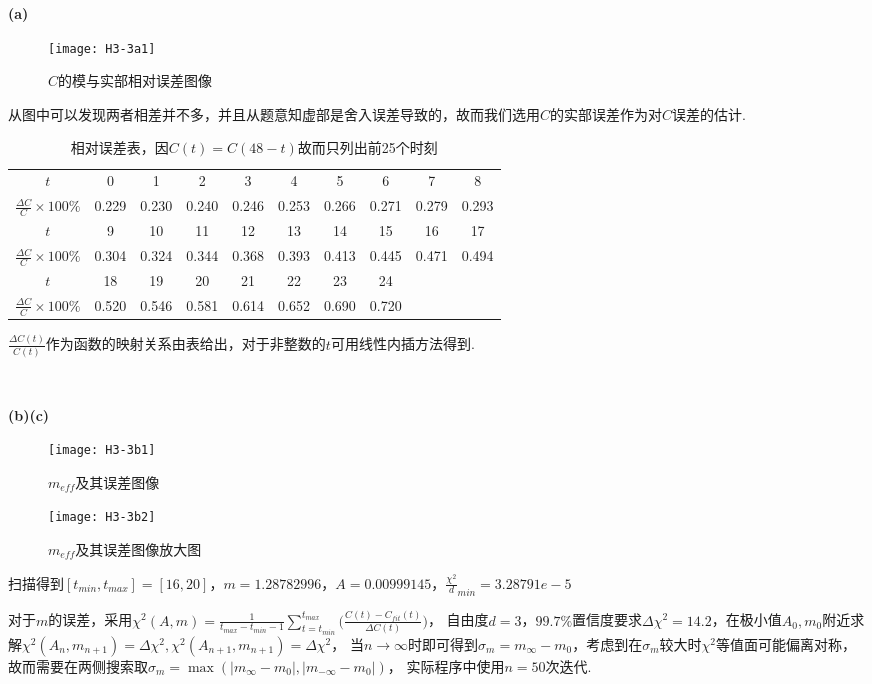 \documentclass[UTF8]{ctexart}
\begin{document}
\noindent\textbf{(a)}

\begin{figure}[H]
\centering
\texttt{[image: H3-3a1]}
\caption{$C$的模与实部相对误差图像}
\end{figure}

从图中可以发现两者相差并不多，并且从题意知虚部是舍入误差导致的，故而我们选用$C$的实部误差作为对$C$误差的估计.

\begin{table}[H]
    \centering
    \caption{相对误差表，因$C(t)=C(48-t)$故而只列出前25个时刻}
    \begin{tabular}{|c|ccccccccc|}
        \hline
        $t$ & 0 & 1 & 2 & 3 & 4 & 5 & 6 & 7 & 8 \\
        \cline{0-0}
        $\frac{\Delta C}{C}\times 100\%$ & 0.229 & 0.230 & 0.240 & 0.246 & 0.253 & 0.266 & 0.271 & 0.279 & 0.293 \\
        \hline
        $t$ & 9 & 10 & 11 & 12 & 13 & 14 & 15 & 16 & 17 \\
        \cline{0-0}
        $\frac{\Delta C}{C}\times 100\%$ & 0.304 & 0.324 & 0.344 & 0.368 & 0.393 & 0.413 & 0.445 & 0.471 & 0.494 \\
        \hline
        $t$ & 18 & 19 & 20 & 21 & 22 & 23 & 24 & ~ & ~\\
        \cline{0-0}
        $\frac{\Delta C}{C}\times 100\%$ & 0.520 & 0.546 & 0.581 & 0.614 & 0.652 & 0.690 & 0.720 & ~ & ~ \\
        \hline
    \end{tabular}
\end{table}

$\frac{\Delta C(t)}{C(t)}$作为函数的映射关系由表给出，对于非整数的$t$可用线性内插方法得到.

~\

\noindent\textbf{(b)(c)}

\begin{figure}[H]
    \centering
    \texttt{[image: H3-3b1]}
    \caption{$m_{eff}$及其误差图像}
\end{figure}

\begin{figure}[H]
    \centering
    \texttt{[image: H3-3b2]}
    \caption{$m_{eff}$及其误差图像放大图}
\end{figure}

扫描得到$[t_{min},t_{max}]=[16,20]$，$m=1.28782996$，$A=0.00999145$，$\frac{\chi^2}{d}_{min}=3.28791e-5$

对于$m$的误差，采用$\chi^2(A,m)=\frac{1}{t_{max}-t_{min}-1}\sum_{t=t_{min}}^{t_{max}}\Big(\frac{C(t)-C_{fit}(t)}{\Delta C(t)}\Big)$，
自由度$d=3$，$99.7\%$置信度要求$\Delta \chi^2=14.2$，在极小值$A_0,m_0$附近求解$\chi^2(A_n,m_{n+1})=\Delta\chi^2,\chi^2(A_{n+1},m_{n+1})=\Delta\chi^2$，
当$n\rightarrow\infty$时即可得到$\sigma_{m}=m_\infty-m_0$，考虑到在$\sigma_{m}$较大时$\chi^2$等值面可能偏离对称，故而需要在两侧搜索取$\sigma_{m}=\max(|m_\infty-m_0|,|m_{-\infty}-m_0|)$，
实际程序中使用$n=50$次迭代.
\end{document}
